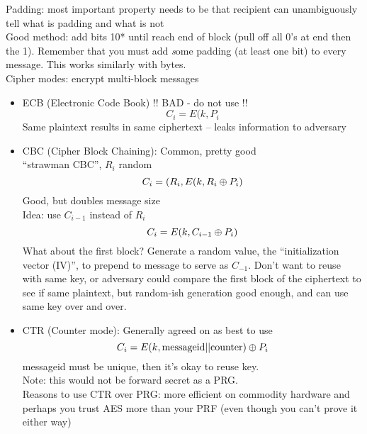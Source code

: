Padding: most important property needs to be that recipient can unambiguously
    tell what is padding and what is not\\

    Good method: add bits 10* until reach end of block (pull off all 0's at end
    then the 1). Remember that you must add {\emph some} padding (at least one
    bit) to every message. This works similarly with bytes.\\

\bigskip
Cipher modes: encrypt multi-block messages
\begin{itemize}
    \item ECB (Electronic Code Book) !! BAD - do not use !!
        $$C_i = E(k, P_i$$
        Same plaintext results in same ciphertext -- leaks information to
        adversary
    \item CBC (Cipher Block Chaining): Common, pretty good\\
        ``strawman CBC'', $R_i$ random
        $$C_i = (R_i, E(k, R_i \oplus P_i)$$
        Good, but doubles message size\\
        Idea: use $C_{i-1}$ instead of $R_i$\\
        $$C_i = E(k, C_{i-1} \oplus P_i)$$
        What about the first block? Generate a random value, the
        ``initialization vector (IV)'', to prepend to message to serve as
        $C_{-1}$. Don't want to reuse with same key, or adversary could compare
        the first block of the ciphertext to see if same plaintext, but
        random-ish generation good enough, and can use same key over and over.
    \item CTR (Counter mode): Generally agreed on as best to use
        $$C_i = E(k, \text{messageid} || \text{counter}) \oplus P_i$$
        messageid must be unique, then it's okay to reuse key.\\
        Note: this would not be forward secret as a PRG.\\
        Reasons to use CTR over PRG: more efficient on commodity hardware and
        perhaps you trust AES more than your PRF (even though you can't prove it
        either way)
\end{itemize}
